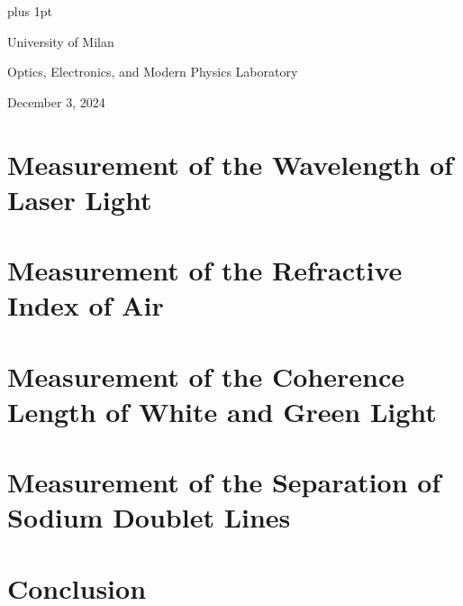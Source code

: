\documentclass[a4paper,12pt]{article}
\begin{document}
\parskip=10pt plus 1pt
\parindent=0pt

\begin{center}
    University of Milan

\par{\Large{Optics, Electronics, and Modern Physics Laboratory}}  

December 3, 2024 
\par


\end{center}


\section{Measurement of the Wavelength of Laser Light}




\section{Measurement of the Refractive Index of Air }




\section{Measurement of the Coherence Length of White and Green Light}


\section{Measurement of the Separation of Sodium Doublet Lines}


\section{Conclusion}

\end{document}
